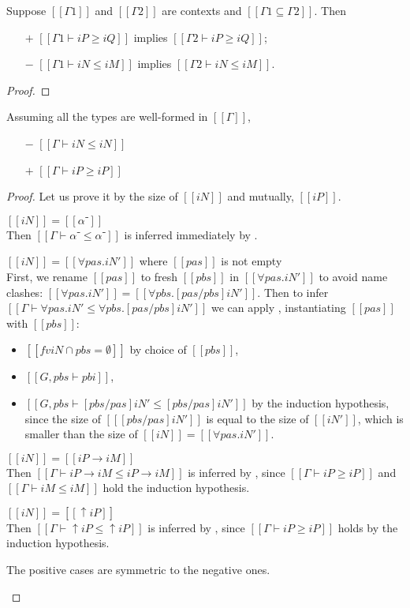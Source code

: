 \begin{lemma}
  \label{lemma:subt-weakening}
  Suppose $[[Γ1]]$ and $[[Γ2]]$ are contexts 
  and $[[ {Γ1} ⊆ {Γ2} ]]$.
  Then 
  \begin{enumerate}
    \item [$+$] $[[Γ1 ⊢ iP ≥ iQ]]$ implies $[[Γ2 ⊢ iP ≥ iQ]]$;
    \item [$-$] $[[Γ1 ⊢ iN ≤ iM]]$ implies $[[Γ2 ⊢ iN ≤ iM]]$.
  \end{enumerate}
\end{lemma}
\begin{proof}
\end{proof}


\begin{lemma} \label{lemma:subtyping-reflexivity}
  Assuming all the types are well-formed in $[[Γ]]$,
  \begin{itemize}
    \item [$-$] $[[Γ ⊢ iN ≤ iN]]$
    \item [$+$] $[[Γ ⊢ iP ≥ iP]]$
  \end{itemize}
\end{lemma}
\begin{proof}
  Let us prove it by the size of $[[iN]]$ and mutually, $[[iP]]$.
  \begin{caseof}
    \item $[[iN]] = [[α⁻]]$\\
      Then $[[Γ ⊢ α⁻ ≤ α⁻]]$ is inferred immediately by .
    \item $[[iN]] = [[∀pas.iN']]$ where $[[pas]]$ is not empty\\
      First, we rename $[[pas]]$ to fresh $[[pbs]]$ in $[[∀pas.iN']]$ to avoid
      name clashes: $[[∀pas.iN']] = [[∀pbs.[pas/pbs]iN']]$.
      Then to infer $[[Γ ⊢ ∀pas.iN' ≤ ∀pbs.[pas/pbs]iN']]$ we can apply 
      , instantiating $[[pas]]$ with $[[pbs]]$:
      \begin{itemize}
        \item $[[fv iN ∩ {pbs} = ∅ ]]$ by choice of $[[pbs]]$,
        \item $[[G, pbs ⊢ pbi]]$,
        \item $[[G, pbs ⊢ [pbs/pas] iN' ≤ [pbs/pas] iN']]$ by the induction hypothesis,
        since the size of $[[ [pbs/pas]iN' ]]$ is equal to the size of $[[iN']]$,
        which is smaller than the size of $[[iN]] = [[∀pas.iN']]$.
      \end{itemize}
    \item $[[iN]] = [[iP → iM]]$\\
      Then $[[Γ ⊢ iP → iM ≤ iP → iM]]$ is inferred by ,
      since $[[Γ ⊢ iP ≥ iP]]$ and $[[Γ ⊢ iM ≤ iM]]$ hold the induction hypothesis. 
    \item $[[iN]] = [[↑iP]]$\\
      Then $[[Γ ⊢ ↑iP ≤ ↑iP]]$ is inferred by ,
      since $[[Γ ⊢ iP ≥ iP]]$ holds by the induction hypothesis.
    \item The positive cases are symmetric to the negative ones.
  \end{caseof}
\end{proof}

